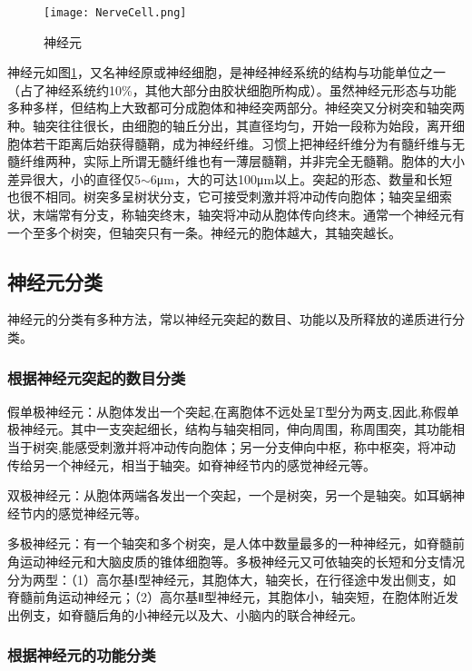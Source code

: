 \documentclass[a4paper,12pt]{article}
\begin{document}
\begin{figure}[!htb]
\centering

\par \hspace{2ex}
\texttt{[image: NerveCell.png]}
\caption{神经元}\label{fig 2} 
\end{figure}


神经元\cite{18:book}如图\ref{fig 2}，又名神经原或神经细胞，是神经神经系统的结构与功能单位之一（占了神经系统约10\%，其他大部分由胶状细胞所构成）。虽然神经元形态与功能多种多样，但结构上大致都可分成胞体和神经突两部分。神经突又分树突和轴突两种。轴突往往很长，由细胞的轴丘分出，其直径均匀，开始一段称为始段，离开细胞体若干距离后始获得髓鞘，成为神经纤维。习惯上把神经纤维分为有髓纤维与无髓纤维两种，实际上所谓无髓纤维也有一薄层髓鞘，并非完全无髓鞘。胞体的大小差异很大，小的直径仅5$\sim$6μm，大的可达100μm以上。突起的形态、数量和长短也很不相同。树突多呈树状分支，它可接受刺激并将冲动传向胞体；轴突呈细索状，末端常有分支，称轴突终末，轴突将冲动从胞体传向终末。通常一个神经元有一个至多个树突，但轴突只有一条。神经元的胞体越大，其轴突越长。

\subsection{神经元分类}

神经元的分类有多种方法，常以神经元突起的数目、功能以及所释放的递质进行分类。

\subsubsection{根据神经元突起的数目分类}

 
假单极神经元：从胞体发出一个突起,在离胞体不远处呈T型分为两支,因此,称假单极神经元。其中一支突起细长，结构与轴突相同，伸向周围，称周围突，其功能相当于树突,能感受刺激并将冲动传向胞体；另一分支伸向中枢，称中枢突，将冲动传给另一个神经元，相当于轴突。如脊神经节内的感觉神经元等。


双极神经元：从胞体两端各发出一个突起，一个是树突，另一个是轴突。如耳蜗神经节内的感觉神经元等。


多极神经元：有一个轴突和多个树突，是人体中数量最多的一种神经元，如脊髓前角运动神经元和大脑皮质的锥体细胞等。多极神经元又可依轴突的长短和分支情况分为两型：（1）高尔基Ⅰ型神经元，其胞体大，轴突长，在行径途中发出侧支，如脊髓前角运动神经元；（2）高尔基Ⅱ型神经元，其胞体小，轴突短，在胞体附近发出例支，如脊髓后角的小神经元以及大、小脑内的联合神经元。


\subsubsection{根据神经元的功能分类}
\end{document}
